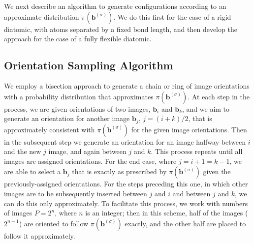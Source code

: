         We next describe an algorithm to generate configurations according to an approximate distribution $\tilde\pi({\mathbf b}^{(\sigma)})$. We do this first for the case of a rigid diatomic, with atoms separated by a fixed bond length, and then develop the approach for the case of a fully flexible diatomic.
    \subsection{Orientation Sampling Algorithm}
    \label{subsec:orMove}
        We employ a bisection approach to generate a chain or ring of image orientations with a probability distribution that approximates $\pi({\mathbf b}^{(\sigma)})$. At each step in the process, we are given orientations of two images, ${\mathbf b}_i$ and ${\mathbf b}_k$, and we aim to generate an orientation for another image ${\mathbf b}_j$, $j = (i+k)/2$, that is approximately consistent with $\pi({\mathbf b}^{(\sigma)})$ for the given image orientations. Then in the subsequent step we generate an orientation for an image halfway between $i$ and the new $j$ image, and again between $j$ and $k$. This process repeats until all images are assigned orientations. For the end case, where $j = i+1 = k-1$, we are able to select a ${\mathbf b}_j$ that is exactly as prescribed by $\pi({\mathbf b}^{(\sigma)})$ given the previously-assigned orientations. For the steps preceding this one, in which other images are to be subsequently inserted between $j$ and $i$ and between $j$ and $k$, we can do this only approximately. To facilitate this process, we work with numbers of images $P = 2^n$, where $n$ is an integer; then in this scheme, half of the images ($2^{n-1}$) are oriented to follow $\pi({\mathbf b}^{(\sigma)})$ exactly, and the other half are placed to follow it approximately.

